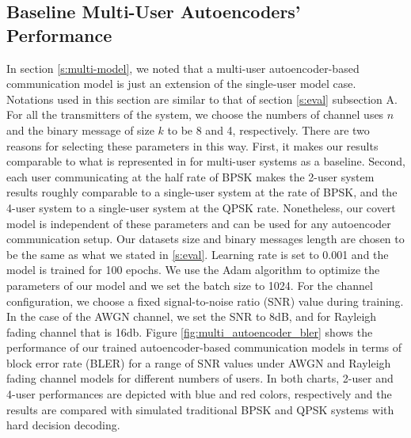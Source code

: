 \subsection{Baseline Multi-User Autoencoders' Performance}
In section \ref{s:multi-model}, we noted that a multi-user autoencoder-based communication model is just an extension of the single-user model case. Notations used in this section are similar to that of section \ref{s:eval} subsection A. For all the transmitters of the system, we choose the numbers of channel uses \(n\) and the binary message of size \(k\) to be 8 and 4, respectively. There are two reasons for selecting these parameters in this way. First, it makes our results comparable to what is represented in \cite{o2017introduction} for multi-user systems as a baseline. Second, each user communicating at the half rate of BPSK makes the 2-user system results roughly comparable to a single-user system at the rate of BPSK, and the 4-user system to a single-user system at the QPSK rate. Nonetheless, our covert model is independent of these parameters and can be used for any autoencoder communication setup. Our datasets size and binary messages length are chosen to be the same as what we stated in \ref{s:eval}. Learning rate is set to 0.001 and the model is trained for 100 epochs. We use the Adam algorithm \cite{kingma2014adam} to optimize the parameters of our model and we set the batch size to 1024. For the channel configuration, we choose a fixed signal-to-noise ratio (SNR) value during training. In the case of the AWGN channel, we set the SNR to 8dB, and for Rayleigh fading channel that is 16db. Figure \ref{fig:multi_autoencoder_bler} shows the performance of our trained autoencoder-based communication models in terms of block error rate (BLER) for a range of SNR values under AWGN and Rayleigh fading channel models for different numbers of users. In both charts, 2-user and 4-user performances are depicted with blue and red colors, respectively and the results are compared with simulated traditional BPSK and QPSK systems with hard decision decoding.


